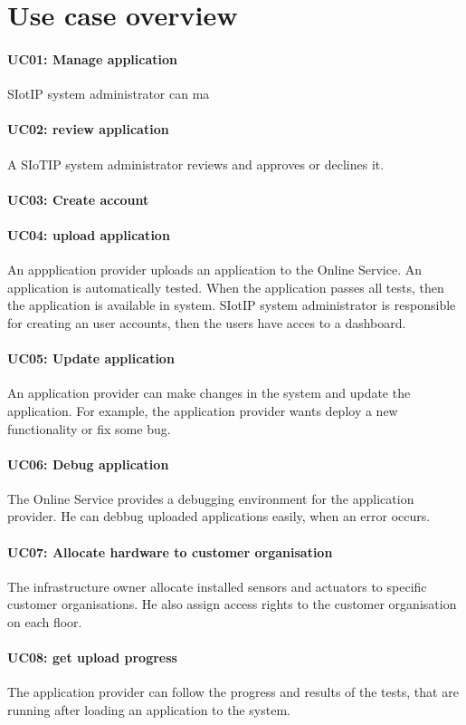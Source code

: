 \section{Use case overview}\label{sec:uc_overview}

\paragraph{UC01: Manage application}
SIotIP system administrator can ma
\paragraph{UC02: review application}
A SIoTIP system administrator reviews and approves or declines it.
\paragraph{UC03: Create account}
\paragraph{UC04: upload application}
An appplication provider uploads an application to the Online Service.
An application is automatically tested. When the application passes all tests, then the application is available in system.
SIotIP system administrator is responsible for creating an user accounts, then
the users have acces to a dashboard.
\paragraph{UC05: Update application}
An application provider can make changes in the system and update the application.
For example, the application provider wants deploy a new functionality or fix
some bug.
\paragraph{UC06: Debug application}
The Online Service provides a debugging environment for the application provider.
He can debbug uploaded applications easily, when an error occurs.
\paragraph{UC07: Allocate hardware to customer organisation}
The infrastructure owner allocate installed sensors and actuators to specific customer organisations. He also assign access rights to the customer organisation on each floor.
\paragraph{UC08: get upload progress}
The application provider can follow the progress and results of the tests, that
are running after loading an application to the system.
